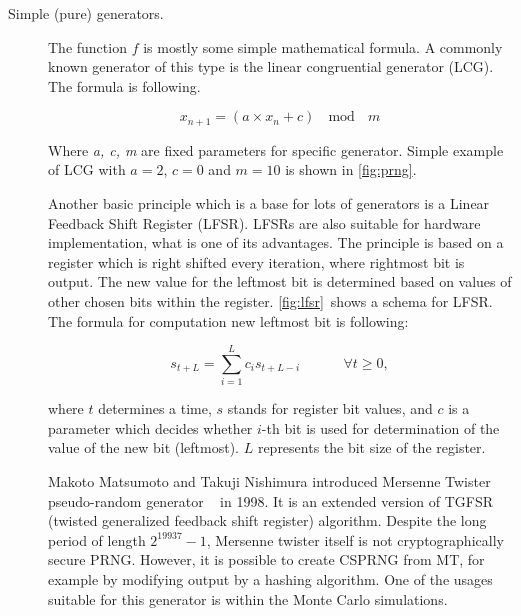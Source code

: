 \documentclass[
    digital,    %
    oneside,    %
    color,
    11pt,
    nocover,
    notable,
    nolof,
    nolot,
    final
]{fithesis3}
\renewcommand\_{\textunderscore\allowbreak}
\begin{document}
\begin{description}
	\item[Simple (pure) generators.] The function $f$ is mostly some simple mathematical formula. A commonly known generator of this type is the linear congruential generator (LCG). The formula is following. \cite{LEcuyer07testu01}
	
	\begin{equation}
	x_{n+1} = \left( a \times x_n + c \right)~~\bmod~~m
	\label{formula:lcg}
	\end{equation}	
	

Where \textit{a, c, m} are fixed parameters for specific generator. Simple example of LCG with $a = 2$, $c = 0$ and $m = 10$ is shown in \cref{fig:prng}.

Another basic principle which is a base for lots of generators is a Linear Feedback Shift Register (LFSR). LFSRs are also suitable for hardware implementation, what is one of its advantages. The principle is based on a register which is right shifted every iteration, where rightmost bit is output. The new value for the leftmost bit is determined based on values of other chosen bits within the register. \cref{fig:lfsr}~shows a schema for LFSR. The formula for computation new leftmost bit is following:

\begin{equation}
s_{t + L} = \sum_{i = 1}^{L} c_{i}s_{t + L - i}~~~~~~~~~~~~~~\forall t \geq 0, 
\end{equation}

where $t$ determines a time, $s$ stands for register bit values, and $c$ is a parameter which decides whether $i$-th bit is used for determination of the value of the new bit (leftmost). $L$ represents the bit size of the register. \cite{Canteaut2005}

Makoto Matsumoto and Takuji Nishimura introduced Mersenne Twister pseudo-random generator ~\cite{Matsumoto:1998:MTE:272991.272995} in 1998. It is an extended version of TGFSR~\cite{matsumoto1992twisted} (twisted generalized feedback shift register) algorithm. Despite the long period of length $2^{19937} - 1$, Mersenne twister itself is not cryptographically secure PRNG. However, it is possible to create CSPRNG from MT, for example by modifying output by a hashing algorithm. One of the usages suitable for this generator is within the Monte Carlo simulations. 


\end{description}
\end{document}
